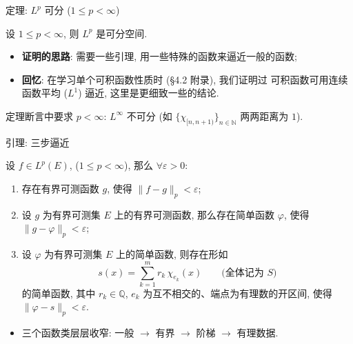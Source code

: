 \begin{frame}{定理: $L^p$ 可分 ($1 \leqslant p < \infty$)}

\begin{thm}[$L^p$ 的可分性]
设 $1 \leqslant p < \infty$, 则 $L^p$ 是可分空间.
\end{thm}

\pause

\begin{itemize}
\item \textbf{证明的思路}: 需要一些引理, 用一些\alert{特殊的函数}来逼近一般的函数;
\item \textbf{回忆}: 在学习单个可积函数性质时 (\S 4.2 附录), 我们证明过
  可积函数可用连续函数\alert{平均 ($L^1$) 逼近}, 这里是更细致一些的结论.
\end{itemize}

\pause

\begin{remark}
定理断言中要求 $p < \infty$: $L^\infty$ 不可分
(如 $\big\{ \chi_{[n, n+1)} \big\}_{n \in \mathbb{N}}$ 两两距离为 $1$).
\end{remark}

\end{frame}


\begin{frame}{引理: 三步逼近}

\begin{lem}[三步逼近]
设 $f \in L^p(E)$, ($1 \leqslant p < \infty$), 那么 $\forall \varepsilon > 0$:
\begin{enumerate}
\item 存在\alert{有界可测}函数 $g$, 使得 $\lVert f - g \rVert_p < \varepsilon$;
\item 设 $g$ 为\alert{有界可测集 $E$ 上的有界可测}函数, 那么存在\alert{简单函数}
  $\varphi$, 使得 $\lVert g - \varphi \rVert_p < \varepsilon$;
\item 设 $\varphi$ 为有界可测集 $E$ 上的简单函数, 则存在形如
\[
s(x) = \sum_{k=1}^{m} r_k \, \chi_{e_k}(x)
\qquad \text{(全体记为 } S\text{)}
\]
的简单函数, 其中 $r_k \in \mathbb{Q}$, $e_k$ 为互不相交的、端点为有理数的开区间,
使得 $\lVert \varphi - s \rVert_p < \varepsilon$.
\end{enumerate}
\end{lem}

\pause

\begin{itemize}
\item 三个函数类层层收窄: 一般 $\to$ 有界 $\to$ 阶梯 $\to$ \alert{有理数据}.
\end{itemize}

\end{frame}

